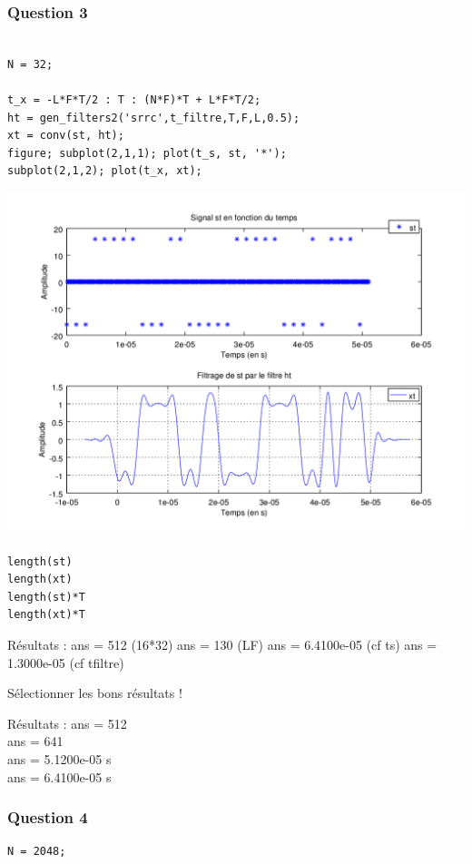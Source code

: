 \documentclass{acm_proc_article-sp}
\begin{document}
\begin{center}
\begin{center}
\subsubsection{Question 3}
\begin{center}
\begin{lstlisting}

N = 32;

t_x = -L*F*T/2 : T : (N*F)*T + L*F*T/2;
ht = gen_filters2('srrc',t_filtre,T,F,L,0.5);
xt = conv(st, ht);
figure; subplot(2,1,1); plot(t_s, st, '*');
subplot(2,1,2); plot(t_x, xt);
\end{lstlisting}

\includegraphics[scale=0.45]{conv_3_3.png}

\begin{lstlisting}
length(st)
length(xt)
length(st)*T
length(xt)*T
\end{lstlisting}
\end{center}


Résultats : ans =  512 (16*32)
ans =  130 (LF)
ans =    6.4100e-05 (cf ts)
ans =    1.3000e-05 (cf tfiltre)

Sélectionner les bons résultats !

Résultats : ans =  512\\
ans =  641\\
ans =    5.1200e-05 s\\
ans =    6.4100e-05 s\\


\subsubsection{Question 4}
\begin{lstlisting}
N = 2048;


\end{lstlisting}
\end{center}
\end{center}
\end{document}
